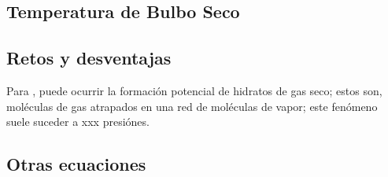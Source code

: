 \subsection{Temperatura de Bulbo Seco}



\subsection{Retos y desventajas}
Para \parencite[p. 8]{Bell2017}, puede ocurrir la formación potencial de hidratos de gas seco; estos son, moléculas de gas atrapados en una red de moléculas de vapor; este fenómeno suele suceder a xxx presiónes.
\subsection{Otras ecuaciones}


